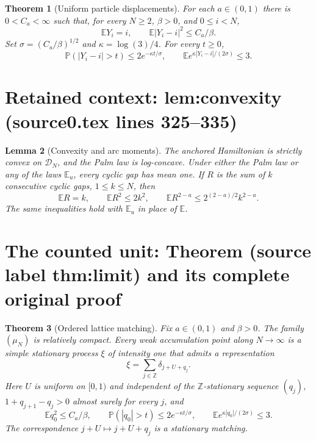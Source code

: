 \documentclass[10pt,a4paper]{amsart}
\newcommand{\E}{\mathbb E}
\newcommand{\Prob}{\mathbb P}
\newcommand{\Z}{\mathbb Z}
\theoremstyle{plain}
\newtheorem{theorem}{Theorem}[section]
\newtheorem{lemma}[theorem]{Lemma}
\theoremstyle{remark}
\begin{document}
\begin{theorem}[Uniform particle displacements]\label{thm:finite}
For each $a\in(0,1)$ there is $0<C_a<\infty$ such that, for every
$N\ge2$, $\beta>0$, and $0\le i<N$,
\begin{equation}\label{eq:finite}
 \E Y_i=i,\qquad \E|Y_i-i|^2\le C_a/\beta.
\end{equation}
Set $\sigma=(C_a/\beta)^{1/2}$ and $\kappa=\log(3)/4$.
For every $t\ge0$,
\begin{equation}\label{eq:exp}
 \Prob(|Y_i-i|>t)\le2e^{-\kappa t/\sigma},\qquad
 \E e^{\kappa|Y_i-i|/(2\sigma)}\le3.
\end{equation}
\end{theorem}


\section*{Retained context: lem:convexity (source0.tex lines 325--335)}

\begin{lemma}[Convexity and arc moments]\label{lem:convexity}
The anchored Hamiltonian is strictly convex on $\mathcal D_N$,
and the Palm law is log-concave.  Under either the Palm law or any
of the laws $\E_u$, every cyclic gap has mean one.  If $R$ is the
sum of $k$ consecutive cyclic gaps, $1\le k\le N$, then
\begin{equation}\label{eq:arc-moments}
 \E R=k,\qquad \E R^2\le2k^2,\qquad
 \E R^{2-a}\le2^{(2-a)/2}k^{2-a}.
\end{equation}
The same inequalities hold with $\E_u$ in place of $\E$.
\end{lemma}


\section{The counted unit: Theorem (source label thm:limit) and its complete original proof}

\begin{theorem}[Ordered lattice matching]\label{thm:limit}
Fix $a\in(0,1)$ and $\beta>0$. The family $(\mu_N)$ is relatively
compact. Every weak accumulation point along $N\to\infty$ is a
simple stationary process $\xi$ of intensity one that admits a
representation
\begin{equation}\label{eq:matching}
 \xi=\sum_{j\in\Z}\delta_{j+U+q_j}.
\end{equation}
Here $U$ is uniform on $[0,1)$ and independent of the
$\Z$-stationary sequence $(q_j)$,
$1+q_{j+1}-q_j>0$ almost surely for every $j$, and
\begin{equation}\label{eq:limit-moments}
 \E q_0^2\le C_a/\beta,\qquad
 \Prob(|q_0|>t)\le2e^{-\kappa t/\sigma},\qquad
 \E e^{\kappa|q_0|/(2\sigma)}\le3.
\end{equation}
The correspondence $j+U\mapsto j+U+q_j$ is a stationary matching.
\end{theorem}
\end{document}
